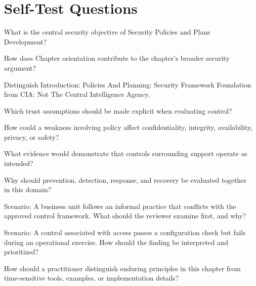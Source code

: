 \documentclass[11pt,letterpaper]{article}
\begin{document}
\section*{Self-Test Questions}
\begin{CornellRecallList}
\item What is the central security objective of Security Policies and Plans Development?
\item How does Chapter orientation contribute to the chapter's broader security argument?
\item Distinguish Introduction: Policies And Planning: Security Framework Foundation from CIA: Not The Central Intelligence Agency.
\item Which trust assumptions should be made explicit when evaluating control?
\item How could a weakness involving policy affect confidentiality, integrity, availability, privacy, or safety?
\item What evidence would demonstrate that controls surrounding support operate as intended?
\item Why should prevention, detection, response, and recovery be evaluated together in this domain?
\item Scenario: A business unit follows an informal practice that conflicts with the approved control framework. What should the reviewer examine first, and why?
\item Scenario: A control associated with access passes a configuration check but fails during an operational exercise. How should the finding be interpreted and prioritized?
\item How should a practitioner distinguish enduring principles in this chapter from time-sensitive tools, examples, or implementation details?
\end{CornellRecallList}
\end{document}
